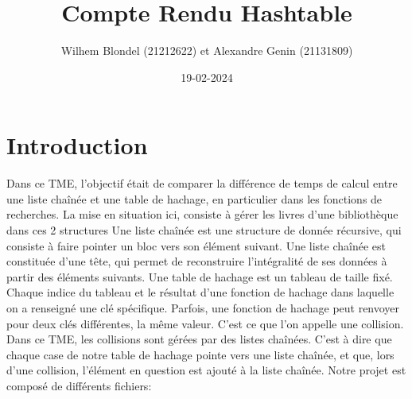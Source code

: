 \documentclass{article}
\title{\Huge Compte Rendu Hashtable}
\date{19-02-2024}
\author{Wilhem Blondel (21212622) et Alexandre Genin (21131809)}
\begin{document}
    \maketitle
    \newpage

    \section{Introduction}
    Dans ce TME, l'objectif était de comparer la différence de temps de calcul
    entre une liste chaînée et une table de hachage, en particulier dans les fonctions
    de recherches. La mise en situation ici, consiste à gérer les livres d'une
    bibliothèque dans ces 2 structures
    \newline \newline
    Une liste chaînée est une structure de donnée récursive, qui consiste à
    faire pointer un bloc vers son élément suivant. Une liste chaînée est 
    constituée d'une tête, qui permet de reconstruire l'intégralité de ses
    données à partir des éléments suivants.
    \newline
    Une table de hachage est un tableau de taille fixé. Chaque indice du tableau
    et le résultat d'une fonction de hachage dans laquelle on a renseigné une
    clé spécifique. Parfois, une fonction de hachage peut renvoyer pour deux clés
    différentes, la même valeur. C'est ce que l'on appelle une collision. 
    \newline
    Dans ce TME, les collisions sont gérées par des listes chaînées. C'est à dire que
    chaque case de notre table de hachage pointe vers une liste chaînée, et que,
    lors d'une collision, l'élément en question est ajouté à la liste chaînée.
    \newline \newline
    Notre projet est composé de différents fichiers:
\end{document}
